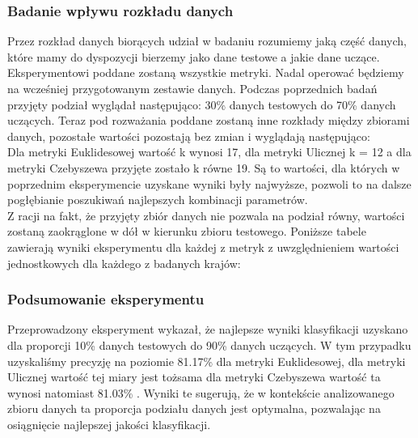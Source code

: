 \documentclass{article}
\begin{document}
\subsubsection*{Badanie wpływu rozkładu danych}

Przez rozkład danych biorących udział w badaniu rozumiemy jaką część danych, które mamy do dyspozycji bierzemy jako dane testowe a jakie dane uczące. Eksperymentowi poddane zostaną wszystkie metryki. Nadal operować będziemy na wcześniej przygotowanym zestawie danych. Podczas poprzednich badań przyjęty podział wyglądał następująco: 30\% danych testowych do 70\% danych uczących. Teraz pod rozważania poddane zostaną inne rozkłady między zbiorami danych, pozostałe wartości pozostają bez zmian i wyglądają następująco: \\

\noindent Dla metryki Euklidesowej wartość k wynosi 17, dla metryki Ulicznej k = 12 a dla metryki Czebyszewa przyjęte zostało k równe 19. Są to wartości, dla których w poprzednim eksperymencie uzyskane wyniki były najwyższe, pozwoli to na dalsze pogłębianie poszukiwań najlepszych kombinacji parametrów.\\

\noindent Z racji na fakt, że przyjęty zbiór danych nie pozwala na podział równy, wartości zostaną zaokrąglone w dół w kierunku zbioru testowego. Poniższe tabele zawierają wyniki eksperymentu dla każdej z metryk z uwzględnieniem wartości jednostkowych dla każdego z badanych krajów:

\newpage
\thispagestyle{empty}

\thispagestyle{empty}

\thispagestyle{empty}

\thispagestyle{empty}
\newpage

\subsubsection*{Podsumowanie eksperymentu}

\noindent Przeprowadzony eksperyment wykazał, że najlepsze wyniki klasyfikacji uzyskano dla proporcji 10\% danych testowych do 90\% danych uczących. W tym przypadku uzyskaliśmy precyzję na poziomie 81.17\% dla metryki Euklidesowej, dla metryki Ulicznej wartość tej miary jest tożsama dla metryki Czebyszewa wartość ta wynosi natomiast 81.03\% . Wyniki te sugerują, że w kontekście analizowanego zbioru danych ta proporcja podziału danych jest optymalna, pozwalając na osiągnięcie najlepszej jakości klasyfikacji. \\
\end{document}
